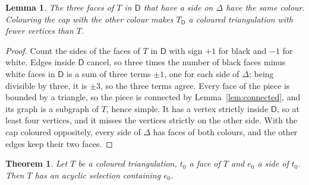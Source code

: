 \documentclass[10pt]{amsart}
\numberwithin{equation}{section}
\newtheorem{theorem}[equation]{Theorem}
\newtheorem{lemma}[equation]{Lemma}
\theoremstyle{definition}
\theoremstyle{remark}
\newcommand{\T}{T}
\begin{document}
\begin{lemma}\label{lem:cap}
The three faces of $\T$ in $\mathsf{D}$ that have a side on $\Delta$ have the same colour.
Colouring the cap with the other colour makes $\T_{\mathsf{D}}$ a coloured triangulation with fewer vertices than $\T$.
\end{lemma}

\begin{proof}
Count the sides of the faces of $\T$ in $\mathsf{D}$ with sign $+1$ for black and $-1$ for white.
Edges inside $\mathsf{D}$ cancel, so three times the number of black faces minus white faces in $\mathsf{D}$ is a sum of three terms $\pm1$, one for each side of $\Delta$; being divisible by three, it is $\pm3$, so the three terms agree.
Every face of the piece is bounded by a triangle, so the piece is connected by Lemma~\ref{lem:connected}, and its graph is a subgraph of $\T$, hence simple.
It has a vertex strictly inside $\mathsf{D}$, so at least four vertices, and it misses the vertices strictly on the other side.
With the cap coloured oppositely, every side of $\Delta$ has faces of both colours, and the other edges keep their two faces.
\end{proof}

\begin{theorem}\label{thm:T}
Let $\T$ be a coloured triangulation, $t_0$ a face of $\T$ and $e_0$ a side of $t_0$.
Then $\T$ has an acyclic selection containing $e_0$.
\end{theorem}
\end{document}
